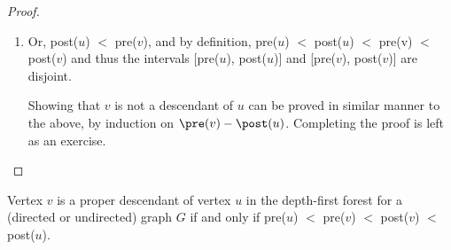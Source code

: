 \begin{proof}
\begin{enumerate}
	  \item Or, post($u$) $<$ pre($v$), and by definition, pre($u$) $<$ post($u$) $<$ pre(v) $<$ post($v$) and thus the intervals [pre($u$), post($u$)] and [pre($v$), post($v$)] are disjoint. 

	    Showing that $v$ is not a descendant of $u$ can be proved in similar manner to the above, by induction on $\pre(v) - \post(u)$. Completing the proof is left as an exercise. 
	\end{enumerate}
\end{proof}

\begin{corollary}
  Vertex $v$ is a proper descendant of vertex $u$ in the depth-first forest for a (directed or undirected) graph $G$ if and only if pre($u$) $<$ pre($v$) $<$ post($v$) $<$ post($u$).
\end{corollary}
  



%
%





